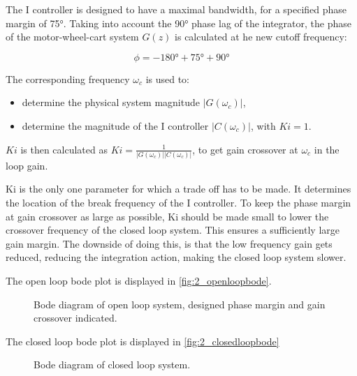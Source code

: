 \documentclass[a4paper]{article}
\newcommand{\newpar}{\vspace{.3cm}\noindent}
\begin{document}
\newpar
The I controller is designed to have a maximal bandwidth, for a specified phase margin of 75°. Taking into account the 90° phase lag of the integrator, the phase of the motor-wheel-cart system \(G(z)\) is calculated at he new cutoff frequency:

\begin{equation}
    \phi = -180° + 75° + 90°
\end{equation}

\newpar
The corresponding frequency \(\omega_{c}\) is used to:

\begin{itemize}
    \item determine the physical system magnitude \( |G(\omega_{c})| \), 
    \item determine the magnitude of the I controller \( |C(\omega_{c})| \), with \(Ki = 1\).
\end{itemize}

\newpar
\(Ki\) is then calculated as \(Ki = \frac{1}{|G(\omega_{c})||C(\omega_{c})|} \), to get gain crossover at \(\omega_{c} \) in the loop gain.

\newpar
Ki is the only one parameter for which a trade off has to be made. It determines the location of the break frequency of the I controller. To keep the phase margin at gain crossover as large as possible, Ki should be made small to lower the crossover frequency of the closed loop system. This ensures a sufficiently large gain margin. The downside of doing this, is that the low frequency gain gets reduced, reducing the integration action, making the closed loop system slower.

\newpar
The open loop bode plot is displayed in \autoref{fig:2_openloopbode}.

\begin{figure}[H]
    \caption{Bode diagram of open loop system, designed phase margin and gain crossover indicated.}
    \label{fig:2_openloopbode}
\end{figure}

\newpar
The closed loop bode plot is displayed in \autoref{fig:2_closedloopbode}

\begin{figure}[H]
    \caption{Bode diagram of closed loop system.}
    \label{fig:2_closedloopbode}
\end{figure}
\end{document}
